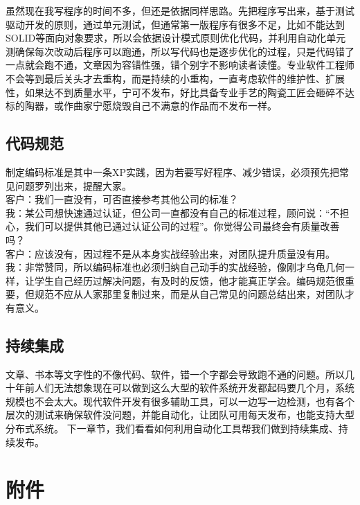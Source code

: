 虽然现在我写程序的时间不多，但还是依据同样思路。先把程序写出来，基于测试驱动开发的原则，通过单元测试，但通常第一版程序有很多不足，比如不能达到SOLID等面向对象要求，所以会依据设计模式原则优化代码，并利用自动化单元测确保每次改动后程序可以跑通，所以写代码也是逐步优化的过程，只是代码错了一点就会跑不通，文章因为容错性强，错个别字不影响读者读懂。专业软件工程师不会等到最后关头才去重构，而是持续的小重构，一直考虑软件的维护性、扩展性，如果达不到质量水平，宁可不发布，好比具备专业手艺的陶瓷工匠会砸碎不达标的陶器，或作曲家宁愿烧毁自己不满意的作品而不发布一样。

\hypertarget{ux4ee3ux7801ux89c4ux8303}{%
\subsection{代码规范}\label{ux4ee3ux7801ux89c4ux8303}}

制定编码标准是其中一条XP实践，因为若要写好程序、减少错误，必须预先把常见问题罗列出来，提醒大家。\\
客户：我们一直没有，可否直接参考其他公司的标准？\\
我：某公司想快速通过认证，但公司一直都没有自己的标准过程，顾问说：``不担心，我们可以提供其他已通过认证公司的过程''。你觉得公司最终会有质量改善吗？\\
客户：应该没有，因过程不是从本身实战经验出来，对团队提升质量没有用。\\
我：非常赞同，所以编码标准也必须归纳自己动手的实战经验，像刚才乌龟几何一样，让学生自己经历过解决问题，有及时的反馈，他才能真正学会。编码规范很重要，但规范不应从人家那里复制过来，而是从自己常见的问题总结出来，对团队才有意义。\\

\hypertarget{ux6301ux7eedux96c6ux6210}{%
\subsection{持续集成}\label{ux6301ux7eedux96c6ux6210}}

文章、书本等文字性的不像代码、软件，错一个字都会导致跑不通的问题。所以几十年前人们无法想象现在可以做到这么大型的软件系统开发都起码要几个月，系统规模也不会太大。现代软件开发有很多辅助工具，可以一边写一边检测，也有各个层次的测试来确保软件没问题，并能自动化，让团队可用每天发布，也能支持大型分布式系统。
下一章节，我们看看如何利用自动化工具帮我们做到持续集成、持续发布。

\hypertarget{ux9644ux4ef6}{%
\section{附件}\label{ux9644ux4ef6}}


